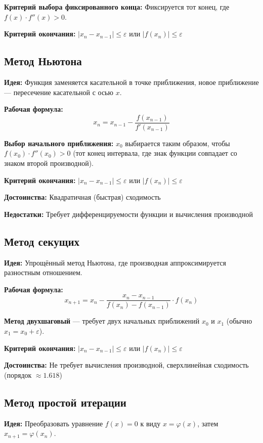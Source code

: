 \documentclass[a4paper,12pt]{article}
\begin{document}
\textbf{Критерий выбора фиксированного конца:} Фиксируется тот конец, где $f(x) \cdot f''(x) > 0$.

\textbf{Критерий окончания:} $|x_n - x_{n-1}| \leq \varepsilon$ или $|f(x_n)| \leq \varepsilon$

\subsection{Метод Ньютона}

\textbf{Идея:} Функция заменяется касательной в точке приближения, новое приближение --- пересечение касательной с осью $x$.

\textbf{Рабочая формула:}
\[
    x_{n} = x_{n-1} - \frac{f(x_{n-1})}{f'(x_{n-1})}
\]

\textbf{Выбор начального приближения:} $x_0$ выбирается таким образом, чтобы $f(x_0) \cdot f''(x_0) > 0$
(тот конец интервала, где знак функции совпадает со знаком второй производной).

\textbf{Критерий окончания:} $|x_n - x_{n-1}| \leq \varepsilon$ или $|f(x_n)| \leq \varepsilon$

\textbf{Достоинства:} Квадратичная (быстрая) сходимость

\textbf{Недостатки:} Требует дифференцируемости функции и вычисления производной

\subsection{Метод секущих}

\textbf{Идея:} Упрощённый метод Ньютона, где производная аппроксимируется разностным отношением.

\textbf{Рабочая формула:}
\[
    x_{n+1} = x_n - \frac{x_n - x_{n-1}}{f(x_n) - f(x_{n-1})} \cdot f(x_n)
\]

\textbf{Метод двухшаговый} --- требует двух начальных приближений $x_0$ и $x_1$ (обычно $x_1 = x_0 + \varepsilon$).

\textbf{Критерий окончания:} $|x_n - x_{n-1}| \leq \varepsilon$ или $|f(x_n)| \leq \varepsilon$

\textbf{Достоинства:} Не требует вычисления производной, сверхлинейная сходимость (порядок $\approx 1.618$)

\subsection{Метод простой итерации}

\textbf{Идея:} Преобразовать уравнение $f(x) = 0$ к виду $x = \varphi(x)$, затем $x_{n+1} = \varphi(x_n)$.
\end{document}
